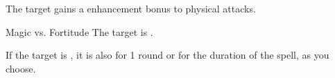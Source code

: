 \begin{spellheader}
\end{spellheader}
\begin{spelleffects}
    \spelleffect The target gains a  enhancement bonus to physical attacks. \spellbonusscalingdescription
\end{spelleffects}
\begin{spellfooter}

\end{spellfooter}

\begin{spellheader}
    \spellrng{\rngmed}
    \spelldur{\durshort \dismissable}
\end{spellheader}
\begin{spelleffects}
    \begin{spellattack}{Magic vs. Fortitude}
        \spellsuccess The target is \sickened.

        If the target is \bloodied, it is also \blinded for 1 round or \deafened for the duration of the spell, as you choose.
    \end{spellattack}
\end{spelleffects}
\begin{spellfooter}

\end{spellfooter}


